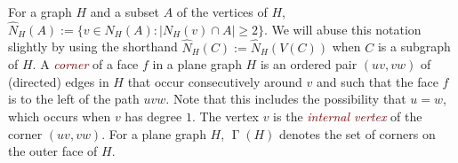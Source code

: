 \documentclass[12pt]{article}
\newtheorem{obs}{Observation}
\DeclareMathOperator{\corners}{\Gamma}
\newcommand{\defin}[1]{\emph{\textcolor{Maroon}{#1}}}
\theoremstyle{definition}
\begin{document}
%


%
%

%





For a graph $H$ and a subset $A$ of the vertices of $H$, $\widehat{N}_{H}(A):=\{v\in N_H(A):|N_H(v)\cap A|\ge 2\}$. We will abuse this notation slightly by using the shorthand $\widehat{N}_H(C):=\widehat{N}_H(V(C))$ when $C$ is a subgraph of $H$.
A \defin{corner} of a face $f$ in a plane graph $H$ is an ordered pair $(uv,vw)$ of (directed) edges in $H$ that occur consecutively around $v$ and such that the face $f$ is to the left of the path $uvw$.  Note that this includes the possibility that $u=w$, which occurs when $v$ has degree $1$. The vertex $v$ is the \defin{internal vertex} of the corner $(uv,vw)$.  For a plane graph $H$, $\corners(H)$ denotes the set of corners on the outer face of $H$.
\end{document}
